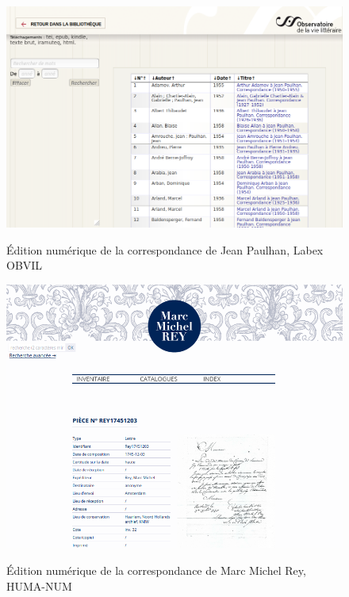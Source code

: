 \begin{figure}[ht]
    \centering
    \caption{ Édition numérique de la correspondance de Jean Paulhan, Labex OBVIL}
    \includegraphics[width=16cm]{images/paulhan_obvil.png}
    \label{paulhan_obvil}
\end{figure}

\begin{figure}[H]
    \centering
    \caption{ Édition numérique de la correspondance de Marc Michel Rey, HUMA-NUM}
    \includegraphics[width=16cm]{images/rey.png}
    \label{rey}
\end{figure}

